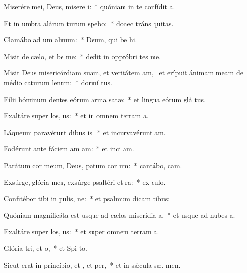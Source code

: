 \item Miserére mei, Deus, misere i:~* quóniam in te confídit  a.
\item Et in umbra alárum turum spebo:~* donec tráns quitas.
\item Clamábo ad um almum:~* Deum, qui be hi.
\item Misit de cælo, et be me:~* dedit in oppróbri tes me.
\item Misit Deus misericórdiam suam, et veritátem am,~\pscross{} et erípuit ánimam meam de médio caturum lenum:~* dormí tus.
\item Fílii hóminum dentes eórum arma  satæ:~* et lingua eórum glá tus.
\item Exaltáre super los, us:~* et in omnem terram  a.
\item Láqueum paravérunt dibus is:~* et incurvavérunt  am.
\item Fodérunt ante fáciem am am:~* et inci  am.
\item Parátum cor meum, Deus, patum cor um:~* cantábo,   cam.
\item Exsúrge, glória mea, exsúrge psaltéri et ra:~* ex culo.
\item Confitébor tibi in pulis, ne:~* et psalmum dicam   tibus:
\item Quóniam magnificáta est usque ad cælos miseridia a,~* et usque ad nubes  a.
\item Exaltáre super los, us:~* et super omnem terram  a.
\item Glória tri, et o,~* et Spi to.
\item Sicut erat in princípio, et , et per,~* et in sǽcula sæ. men.
